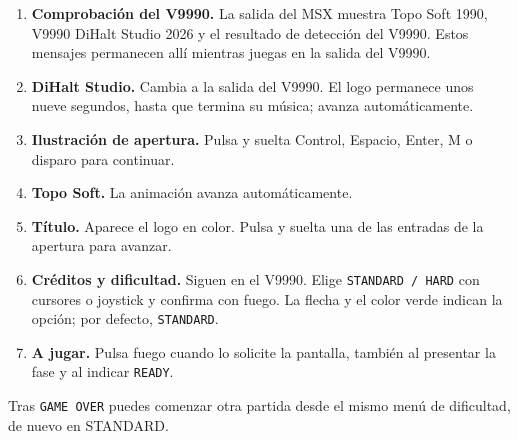 \begin{enumerate}
\item \textbf{Comprobación del V9990.} La salida del MSX muestra Topo Soft 1990, V9990 DiHalt Studio 2026 y el resultado de detección del V9990. Estos mensajes permanecen allí mientras juegas en la salida del V9990.
\item \textbf{DiHalt Studio.} Cambia a la salida del V9990. El logo permanece unos nueve segundos, hasta que termina su música; avanza automáticamente.
\item \textbf{Ilustración de apertura.} Pulsa y suelta Control, Espacio, Enter, M o disparo para continuar.
\item \textbf{Topo Soft.} La animación avanza automáticamente.
\item \textbf{Título.} Aparece el logo en color. Pulsa y suelta una de las entradas de la apertura para avanzar.
\item \textbf{Créditos y dificultad.} Siguen en el V9990. Elige \texttt{STANDARD / HARD} con cursores o joystick y confirma con fuego. La flecha y el color verde indican la opción; por defecto, \texttt{STANDARD}.
\item \textbf{A jugar.} Pulsa fuego cuando lo solicite la pantalla, también al presentar la fase y al indicar \texttt{READY}.
\end{enumerate}
Tras \texttt{GAME OVER} puedes comenzar otra partida desde el mismo menú de dificultad, de nuevo en STANDARD.
